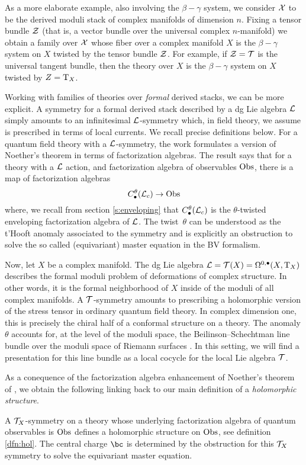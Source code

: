 \documentclass[11pt]{amsart}
\begin{document}
As a more elaborate example, also involving the $\beta-\gamma$ system, we consider $\mathcal X$ to be the derived moduli stack of complex manifolds of dimension $n$.
Fixing a tensor bundle $\mathcal Z$ (that is, a vector bundle over the universal complex $n$-manifold) we obtain a family over $\mathcal X$ whose fiber over a complex manifold $X$ is the $\beta-\gamma$ system on $X$ twisted by the tensor bundle $\mathcal Z$.
For example, if $\mathcal Z = \mathcal T$ is the universal tangent bundle, then the theory over $X$ is the $\beta-\gamma$ system on $X$ twisted by $Z = {\rm T}_{X}$.

Working with families of theories over \textit{formal} derived stacks, we can be more explicit.
A symmetry for a formal derived stack described by a dg Lie algebra $\mathcal L$ simply amounts to an infinitesimal $\mathcal L$-symmetry which, in field theory, we assume is prescribed in terms of local currents.
We recall precise definitions below.
For a quantum field theory with a $\mathcal L$-symmetry, the work \cite{fact2} formulates a version of Noether's theorem in terms of factorization algebras.
The result says that for a theory with a $\mathcal L$ action, and factorization algebra of observables ${\rm Obs}$, there is a map
of factorization algebras
\begin{equation}\label{eqn:noether1}
C_{\bullet}^{\theta}(\mathcal L_{c}) \to {\rm Obs}
\end{equation}
where, we recall from section \ref{s:enveloping} that $C_{\bullet}^{\theta}(\mathcal L_{c})$ is the $\theta$-twisted enveloping factorization algebra of $\mathcal L$.
The twist~$\theta$ can be understood as the t'Hooft anomaly associated to the symmetry and is explicitly an obstruction to solve the so called (equivariant) master equation in the BV formalism.

Now, let $X$ be a complex manifold.
The dg Lie algebra $\mathcal L= \mathcal T(X) = \Omega^{0,\bullet}(X, {\rm T}_{X})$ describes the formal moduli problem of deformations of complex structure.
In other words, it is the formal neighborhood of $X$ inside of the moduli of all complex manifolds.
A $\mathcal T$-symmetry amounts to prescribing a holomorphic version of the stress tensor in ordinary quantum field theory.
In complex dimension one, this is precisely the chiral half of a conformal structure on a theory.
The anomaly $\theta$ accounts for, at the level of the moduli space, the Beilinson--Schechtman line bundle over the moduli
space of Riemann surfaces \cite{BS}.
In this setting, we will find a presentation for this line bundle as a local cocycle for the local Lie algebra $\mathcal T$.


As a conequence of the factorization algebra enhancement of Noether's theorem of \cite{fact2}, we obtain the following linking back to our main definition of a \textit{holomorphic structure}.
\begin{prop}
  A $\mathcal T_{X}$-symmetry on a theory whose underlying factorization algebra of quantum observables is ${\rm Obs}$ defines a holomorphic structure on ${\rm Obs}$, see definition \ref{dfn:hol}.
  The central charge $\bc$ is determined by the obstruction for this $\mathcal T_{X}$ symmetry to solve the equivariant master equation.
\end{prop}
\end{document}
